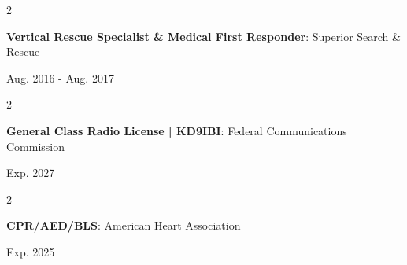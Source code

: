 \documentclass[10pt, letterpaper]{article}
\newenvironment{twocolentry}[2][]{
    \onecolentry
    \def\secondColumn{#2}
    \setcolumnwidth{\fill, 4.5 cm}
    \begin{paracol}{2}
}{
    \switchcolumn \raggedleft \secondColumn
    \end{paracol}
    \endonecolentry
} %
\begin{document}
        \begin{twocolentry}{
            Aug. 2016 - Aug. 2017
        }
            \textbf{Vertical Rescue Specialist \& Medical First Responder}: Superior Search \& Rescue 
        \end{twocolentry}

        \begin{twocolentry}{
            Exp. 2027
        }
            \textbf{General Class Radio License | KD9IBI}: Federal Communications Commission
        \end{twocolentry}

        \begin{twocolentry}{
            Exp. 2025
        }
            \textbf{CPR/AED/BLS}: American Heart Association
        \end{twocolentry}
\end{document}

